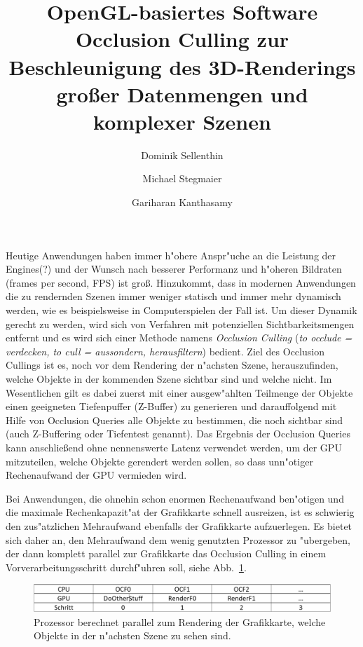 \documentclass[journal]{vgtc}
\author{Dominik Sellenthin \and Michael Stegmaier \and Gariharan Kanthasamy}
\title{OpenGL-basiertes Software Occlusion Culling zur Beschleunigung des 3D-Renderings gro{\ss}er Datenmengen und komplexer Szenen}
\begin{document}


\maketitle

Heutige Anwendungen haben immer h"ohere Anspr"uche an die Leistung der Engines(?) und der Wunsch nach besserer Performanz und h"oheren Bildraten (frames per second, FPS) ist gro{\ss}. Hinzukommt, dass in modernen Anwendungen die zu rendernden Szenen immer weniger statisch und immer mehr dynamisch werden, wie es beispielsweise in Computerspielen der Fall ist. Um dieser Dynamik gerecht zu werden, wird sich von Verfahren mit potenziellen Sichtbarkeitsmengen entfernt \cite{MSOC} und es wird sich einer Methode namens \textit{Occlusion Culling} (\textit{to occlude = verdecken, to cull = aussondern, herausfiltern}) bedient. Ziel des Occlusion Cullings ist es, noch vor dem Rendering der n"achsten Szene, herauszufinden, welche Objekte in der kommenden Szene sichtbar sind und welche nicht. Im Wesentlichen gilt es dabei zuerst mit einer ausgew"ahlten Teilmenge der Objekte einen geeigneten Tiefenpuffer (Z-Buffer) zu generieren und darauffolgend mit Hilfe von Occlusion Queries alle Objekte zu bestimmen, die noch sichtbar sind (auch Z-Buffering oder Tiefentest genannt). Das Ergebnis der Occlusion Queries kann anschlie{\ss}end ohne nennenswerte Latenz verwendet werden, um der GPU mitzuteilen, welche Objekte gerendert werden sollen, so dass unn"otiger Rechenaufwand der GPU vermieden wird.

Bei Anwendungen, die ohnehin schon enormen Rechenaufwand ben"otigen und die maximale Rechenkapazit"at der Grafikkarte schnell ausreizen, ist es schwierig den zus"atzlichen Mehraufwand ebenfalls der Grafikkarte aufzuerlegen. Es bietet sich daher an, den Mehraufwand dem wenig genutzten Prozessor zu "ubergeben, der dann komplett parallel zur Grafikkarte das Occlusion Culling in einem Vorverarbeitungsschritt durchf"uhren soll, siehe Abb.\ \ref{fig:ablauf}.

\begin{figure}%
\includegraphics[width=\columnwidth]{images/Ablauf.PNG}%
\caption{Prozessor berechnet parallel zum Rendering der Grafikkarte, welche Objekte in der n"achsten Szene zu sehen sind.}%
\label{fig:ablauf}%
\end{figure}
\end{document}
